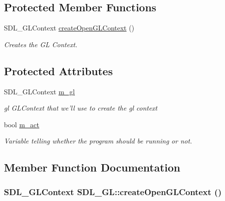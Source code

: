 \subsection*{Protected Member Functions}
\begin{DoxyCompactItemize}
\item 
SDL\_\-GLContext \hyperlink{classSDL__GL_a4f6b35189cdf34868bcfc36bef2e1cf5}{createOpenGLContext} ()
\begin{DoxyCompactList}\small\item\em Creates the GL Context. \item\end{DoxyCompactList}\end{DoxyCompactItemize}
\subsection*{Protected Attributes}
\begin{DoxyCompactItemize}
\item 
\hypertarget{classSDL__GL_a1a03799c74dde243ac135b5fcd13553d}{
SDL\_\-GLContext \hyperlink{classSDL__GL_a1a03799c74dde243ac135b5fcd13553d}{m\_\-gl}}
\label{classSDL__GL_a1a03799c74dde243ac135b5fcd13553d}

\begin{DoxyCompactList}\small\item\em gl GLContext that we'll use to create the gl context \item\end{DoxyCompactList}\item 
\hypertarget{classSDL__GL_ab237ae685aa4972a9ddcef4527cc425c}{
bool \hyperlink{classSDL__GL_ab237ae685aa4972a9ddcef4527cc425c}{m\_\-act}}
\label{classSDL__GL_ab237ae685aa4972a9ddcef4527cc425c}

\begin{DoxyCompactList}\small\item\em Variable telling whether the program should be running or not. \item\end{DoxyCompactList}\end{DoxyCompactItemize}


\subsection{Member Function Documentation}
\hypertarget{classSDL__GL_a4f6b35189cdf34868bcfc36bef2e1cf5}{
\subsubsection[{createOpenGLContext}]{\setlength{\rightskip}{0pt plus 5cm}SDL\_\-GLContext SDL\_\-GL::createOpenGLContext ()}}
\label{classSDL__GL_a4f6b35189cdf34868bcfc36bef2e1cf5}


